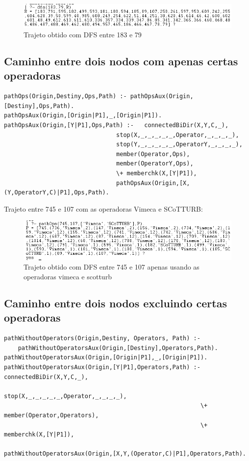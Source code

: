 \documentclass[20pt]{article}
\begin{document}
\vspace{1cm}
\begin{figure}[H]
    \centering
    \includegraphics[scale=0.8]{images/dfs_183_79.png}
    \caption{Trajeto obtido com DFS entre 183 e 79}
\end{figure}

\newpage
\subsection{Caminho entre dois nodos com apenas certas operadoras}
\begin{verbatim}
pathOps(Origin,Destiny,Ops,Path) :- pathOpsAux(Origin,[Destiny],Ops,Path).
pathOpsAux(Origin,[Origin|P1],_,[Origin|P1]).
pathOpsAux(Origin,[Y|P1],Ops,Path) :-   connectedBiDir(X,Y,C,_),
                                stop(X,_,_,_,_,_,Operator,_,_,_,_),
                                stop(Y,_,_,_,_,_,OperatorY,_,_,_,_),
                                member(Operator,Ops),
                                member(OperatorY,Ops),
                                \+ memberchk(X,[Y|P1]), 
                                pathOpsAux(Origin,[X,(Y,OperatorY,C)|P1],Ops,Path). 
\end{verbatim}

Trajeto entre 745 e 107 com as operadoras Vimeca e SCoTTURB:
\vspace{1cm}
\begin{figure}[H]
    \centering
    \includegraphics[scale=0.8]{images/trajeto_vim_scot_745_107.png}
    \caption{Trajeto obtido com DFS entre 745 e 107 apenas usando as operadoras vimeca e scotturb}
\end{figure}

\newpage
\subsection{Caminho entre dois nodos excluindo certas operadoras}
\begin{verbatim}
pathWithoutOperators(Origin,Destiny, Operators, Path) :-
    pathWithoutOperatorsAux(Origin,[Destiny],Operators,Path).
pathWithoutOperatorsAux(Origin,[Origin|P1],_,[Origin|P1]).
pathWithoutOperatorsAux(Origin,[Y|P1],Operators,Path) :- connectedBiDir(X,Y,C,_),
                                                        stop(X,_,_,_,_,_,Operator,_,_,_,_),
                                                        \+ member(Operator,Operators),
                                                        \+ memberchk(X,[Y|P1]), 
                                                        pathWithoutOperatorsAux(Origin,[X,Y,(Operator,C)|P1],Operators,Path).       
\end{verbatim}
\end{document}
